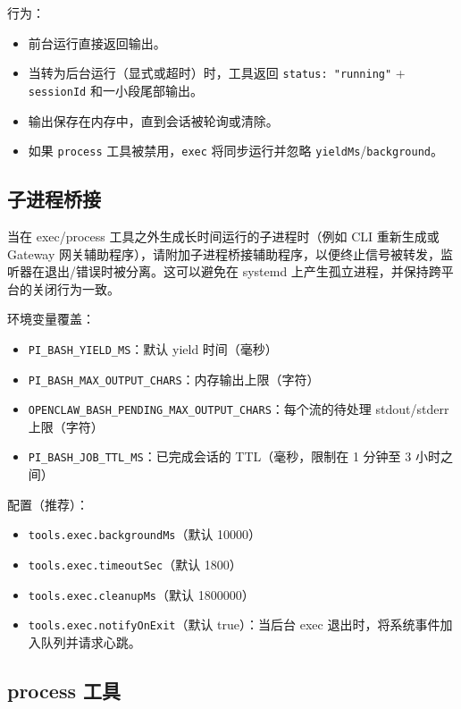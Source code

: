 行为：

\begin{itemize}
  \item 前台运行直接返回输出。
  \item 当转为后台运行（显式或超时）时，工具返回 \texttt{status: "running"} + \texttt{sessionId} 和一小段尾部输出。
  \item 输出保存在内存中，直到会话被轮询或清除。
  \item 如果 \texttt{process} 工具被禁用，\texttt{exec} 将同步运行并忽略 \texttt{yieldMs}/\texttt{background}。
\end{itemize}


\subsection{子进程桥接}


当在 exec/process 工具之外生成长时间运行的子进程时（例如 CLI 重新生成或 Gateway 网关辅助程序），请附加子进程桥接辅助程序，以便终止信号被转发，监听器在退出/错误时被分离。这可以避免在 systemd 上产生孤立进程，并保持跨平台的关闭行为一致。

环境变量覆盖：

\begin{itemize}
  \item \texttt{PI\_BASH\_YIELD\_MS}：默认 yield 时间（毫秒）
  \item \texttt{PI\_BASH\_MAX\_OUTPUT\_CHARS}：内存输出上限（字符）
  \item \texttt{OPENCLAW\_BASH\_PENDING\_MAX\_OUTPUT\_CHARS}：每个流的待处理 stdout/stderr 上限（字符）
  \item \texttt{PI\_BASH\_JOB\_TTL\_MS}：已完成会话的 TTL（毫秒，限制在 1 分钟至 3 小时之间）
\end{itemize}


配置（推荐）：

\begin{itemize}
  \item \texttt{tools.exec.backgroundMs}（默认 10000）
  \item \texttt{tools.exec.timeoutSec}（默认 1800）
  \item \texttt{tools.exec.cleanupMs}（默认 1800000）
  \item \texttt{tools.exec.notifyOnExit}（默认 true）：当后台 exec 退出时，将系统事件加入队列并请求心跳。
\end{itemize}


\subsection{process 工具}


